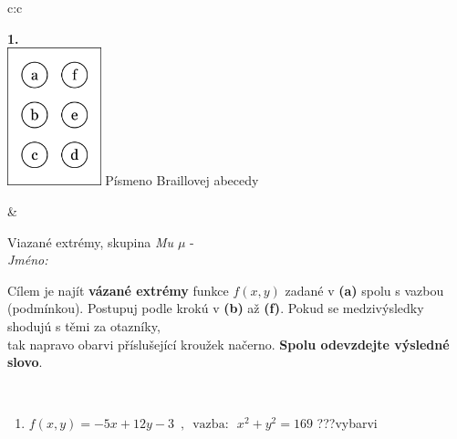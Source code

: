 \documentclass[10pt]{report}
\begin{document}
\begin{tabular}{c:c}
\begin{minipage}[c][104.5mm][t]{0.5\linewidth}
\begin{center}
\begin{minipage}{0.79\linewidth}
\begin{center}
\begin{varwidth}{\linewidth}
\begin{enumerate}
\end{enumerate}
\end{varwidth}
\end{center}
\end{minipage}
\begin{minipage}{0.20\linewidth}
\begin{center}
{\Huge\bfseries 1.} \\[2mm]
\includegraphics[height=40mm]{../images/braille.png}
{\small Písmeno Braillovej abecedy}
\end{center}
\end{minipage}
\end{center}
\end{minipage}
&
\begin{minipage}[c][104.5mm][t]{0.5\linewidth}
\begin{center}
\vspace{7mm}
{\huge Viazané extrémy, skupina \textit{Mu $\mu$} -}\\[5mm]
\textit{Jméno:}\phantom{xxxxxxxxxxxxxxxxxxxxxxxxxxxxxxxxxxxxxxxxxxxxxxxxxxxxxxxxxxxxxxxxx}\\[5mm]
\begin{minipage}{0.95\linewidth}
\begin{center}
Cílem je najít \textbf{vázané extrémy} funkce $f(x,y)$ zadané v \textbf{(a)} spolu s vazbou (podmínkou). Postupuj podle krokú v \textbf{(b)} až \textbf{(f)}. Pokud se medzivýsledky shodujú s těmi za otazníky,\\tak napravo obarvi příslušející kroužek načerno. \textbf{Spolu odevzdejte výsledné slovo}.
\end{center}
\end{minipage}
\\[1mm]
\begin{minipage}{0.79\linewidth}
\begin{center}
\begin{varwidth}{\linewidth}
\begin{enumerate}
\normalsize
\item $f(x,y)=-5x+12y-3 \enspace , \enspace \mathrm{vazba:} \enspace x^2+y^2=169$\quad \dotfill\; ???\;\dotfill \quad vybarvi

\end{enumerate}
\end{varwidth}
\end{center}
\end{minipage}
\end{center}
\end{minipage}
\end{tabular}
\end{document}
